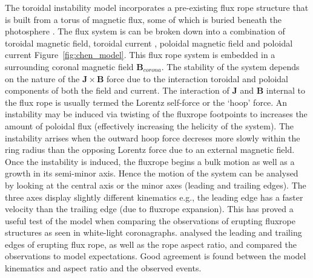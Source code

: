 The toroidal instability model incorporates a pre-existing flux rope structure that is built from a torus of magnetic flux, some of which is buried beneath the photosphere \citep{chen1989}. The flux system is can be broken down into a combination of toroidal magnetic field, toroidal current , poloidal magnetic field and poloidal current Figure~\ref{fig:chen_model}. This flux rope system is embedded in a surrounding coronal magnetic field $\mathbf{B}_{corona}$. The stability of the system depends on the nature of the $\mathbf{J} \times \mathbf{B}$ force due to the interaction toroidal and poloidal components of both the field and current. The interaction of $\mathbf{J}$ and $\mathbf{B}$ internal to the flux rope is usually termed the Lorentz self-force or the \textquoteleft hoop' force. An instability may be induced via twisting of the fluxrope footpoints to increases the amount of poloidal flux (effectively increasing the helicity of the system). The instability arrises when the outward hoop force decreses more slowly within the ring radius than the opposing Lorentz force due to an external magnetic field. Once the instability is induced, the fluxrope begins a bulk motion as well as a growth in its semi-minor axis. Hence the motion of the system can be analysed by looking at the central axis or the minor axes (leading and trailing edges). The three axes display slightly different kinematics e.g., the leading edge has a faster velocity than the trailing edge (due to fluxrope expansion). This has proved a useful test of the model when comparing the observations of erupting fluxrope structures as seen in white-light coronagraphs. \citet{krall2001} analysed the leading and trailing edges of erupting flux rope, as well as the rope aspect ratio, and compared the observations to model expectations. Good agreement is found between the model kinematics and aspect ratio and the observed events.
